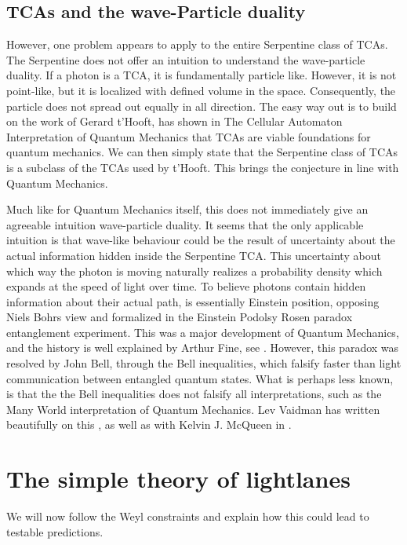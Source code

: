 \documentclass[notitlepage]{article}
\begin{document}
\subsection{TCAs and the wave-Particle duality}
However, one problem appears to apply to the entire Serpentine class of TCAs. The Serpentine does not offer an intuition to understand the wave-particle duality. If a photon is a TCA, it is fundamentally particle like. However, it is not point-like, but it is localized with defined volume in the space. Consequently, the particle does not spread out equally in all direction. The easy way out is to build on the work of Gerard t'Hooft,  has shown in The Cellular Automaton Interpretation of Quantum Mechanics \cite{hooft2014cellular} that TCAs are viable foundations for quantum mechanics. We can then simply state that the Serpentine class of TCAs is a subclass of the TCAs used by t'Hooft. This brings the conjecture in line with Quantum Mechanics. 

Much like for Quantum Mechanics itself, this does not immediately give an agreeable intuition wave-particle duality. It seems that the only applicable intuition is that wave-like behaviour could be the result of uncertainty about the actual information hidden inside the Serpentine TCA. This uncertainty about which way the photon is moving naturally realizes a probability density which expands at the speed of light over time. To believe photons contain hidden information about their actual path, is essentially Einstein position, opposing Niels Bohrs view and formalized in the Einstein Podolsy Rosen paradox entanglement experiment. This was a major development of Quantum Mechanics, and the history is well explained by Arthur Fine, see \cite{sep-qt-epr}. However, this paradox was resolved by John Bell, through the Bell inequalities, which falsify faster than light communication between entangled quantum states. What is perhaps less known, is that the the Bell inequalities does not falsify all interpretations, such as the Many World interpretation of Quantum Mechanics. Lev Vaidman has written beautifully on this  \cite{sep-qm-manyworlds}, as well as with Kelvin J. McQueen in \cite{Many-Worlds-Interpretation}. 


\section{The simple theory of lightlanes}
We will now follow the Weyl constraints and explain how this could lead to testable predictions.
\end{document}
